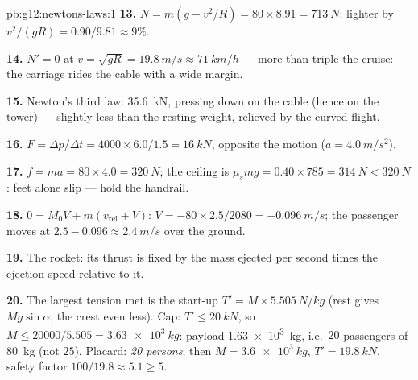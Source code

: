 \begin{solution}{pb:g12:newtons-laws:1}
\textbf{13.} $N = m(g - v^2/R) = 80 \times 8.91 = \qty{713}{N}$:
lighter by $v^2/(gR) = 0.90/9.81 \approx 9\%$.

\textbf{14.} $N' = 0$ at $v = \sqrt{gR} = \qty{19.8}{m/s} \approx
\qty{71}{km/h}$ --- more than triple the cruise: the carriage rides
the cable with a wide margin.

\textbf{15.} Newton's third law: \qty{35.6}{kN}, pressing down on the
cable (hence on the tower) --- slightly less than the resting weight,
relieved by the curved flight.

\textbf{16.} $F = \Delta p/\Delta t = 4000 \times 6.0/1.5 =
\qty{16}{kN}$, opposite the motion ($a = \qty{4.0}{m/s^2}$).

\textbf{17.} $f = ma = 80 \times 4.0 = \qty{320}{N}$; the ceiling is
$\mu_s mg = 0.40 \times 785 = \qty{314}{N} < \qty{320}{N}$: feet
alone slip --- hold the handrail.

\textbf{18.} $0 = M_0 V + m(v_{\text{rel}} + V)$:
$V = -80 \times 2.5/2080 = \qty{-0.096}{m/s}$; the passenger moves at
$2.5 - 0.096 \approx \qty{2.4}{m/s}$ over the ground.

\textbf{19.} The rocket: its thrust is fixed by the mass ejected per
second times the ejection speed relative to it.

\textbf{20.} The largest tension met is the start-up
$T' = M \times \qty{5.505}{N/kg}$ (rest gives $Mg\sin\alpha$, the
crest even less). Cap: $T' \leq \qty{20}{kN}$, so
$M \leq 20000/5.505 = \qty{3.63e3}{kg}$: payload
\qty{1.63e3}{kg}, i.e.\ $20$ passengers of \qty{80}{kg} (not $25$).
Placard: \emph{20 persons}; then $M = \qty{3.6e3}{kg}$,
$T' = \qty{19.8}{kN}$, safety factor $100/19.8 \approx 5.1 \geq 5$.
\end{solution}
